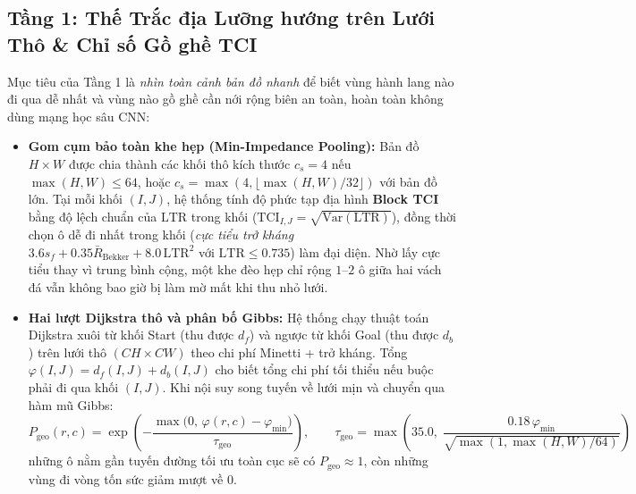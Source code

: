 \documentclass[12pt, a4paper]{article}
\begin{document}
\subsection{Tầng 1: Thế Trắc địa Lưỡng hướng trên Lưới Thô \& Chỉ số Gồ ghề TCI}
Mục tiêu của Tầng 1 là \textit{nhìn toàn cảnh bản đồ nhanh} để biết vùng hành lang nào đi qua dễ nhất và vùng nào gồ ghề cần nới rộng biên an toàn, hoàn toàn không dùng mạng học sâu CNN:
\begin{itemize}
    \item \textbf{Gom cụm bảo toàn khe hẹp (Min-Impedance Pooling):} Bản đồ $H \times W$ được chia thành các khối thô kích thước $c_s = 4$ nếu $\max(H,W) \le 64$, hoặc $c_s = \max(4, \lfloor \max(H,W)/32 \rfloor)$ với bản đồ lớn. Tại mỗi khối $(I,J)$, hệ thống tính độ phức tạp địa hình \textbf{Block TCI} bằng độ lệch chuẩn của $\text{LTR}$ trong khối ($\text{TCI}_{I,J} = \sqrt{\text{Var}(\text{LTR})}$), đồng thời chọn ô dễ đi nhất trong khối (\textit{cực tiểu trở kháng} $3.6 s_f + 0.35\bar{R}_{\text{Bekker}} + 8.0\,\text{LTR}^2$ với $\text{LTR} \le 0.735$) làm đại diện. Nhờ lấy cực tiểu thay vì trung bình cộng, một khe đèo hẹp chỉ rộng $1\text{--}2$ ô giữa hai vách đá vẫn không bao giờ bị làm mờ mất khi thu nhỏ lưới.
    \item \textbf{Hai lượt Dijkstra thô và phân bố Gibbs:} Hệ thống chạy thuật toán Dijkstra \cite{dijkstra1959} xuôi từ khối Start (thu được $d_f$) và ngược từ khối Goal (thu được $d_b$) trên lưới thô $(CH \times CW)$ theo chi phí Minetti + trở kháng. Tổng $\varphi(I,J) = d_f(I,J) + d_b(I,J)$ cho biết tổng chi phí tối thiểu nếu buộc phải đi qua khối $(I,J)$. Khi nội suy song tuyến về lưới mịn và chuyển qua hàm mũ Gibbs:
    \begin{equation}
        P_{\text{geo}}(r,c) = \exp\left( -\frac{\max\big(0,\, \varphi(r,c) - \varphi_{\min}\big)}{\tau_{\text{geo}}} \right), \qquad \tau_{\text{geo}} = \max\!\left(35.0,\; \frac{0.18\,\varphi_{\min}}{\sqrt{\max(1, \max(H,W)/64)}}\right)
        \label{eq:gibbs_geo}
    \end{equation}
    những ô nằm gần tuyến đường tối ưu toàn cục sẽ có $P_{\text{geo}} \approx 1$, còn những vùng đi vòng tốn sức giảm mượt về $0$.
\end{itemize}
\end{document}
